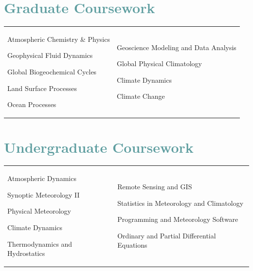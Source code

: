 \documentclass[margin,line,palatino,courier,10pt]{res}
\newenvironment{list1}{
  \begin{list}{\ding{113}}{%
      \setlength{\itemsep}{0in}
      \setlength{\parsep}{0in} \setlength{\parskip}{0in}
      \setlength{\topsep}{0in} \setlength{\partopsep}{0in}
      \setlength{\leftmargin}{0.17in}}}{\end{list}}
\begin{document}
\begin{resume}
\section{\sc \textcolor{CadetBlue}{\large{Graduate Coursework}}}
\vspace{-0.1in}
\begin{tabular}{@{}p{2.2in}p{3in}}
\begin{list1}
\item Atmospheric Chemistry \& Physics 
\item Geophysical Fluid Dynamics
\item Global Biogeochemical Cycles
\item Land Surface Processes
\item Ocean Processes
\end{list1}
&
\begin{list1}
\item Geoscience Modeling and Data Analysis
\item Global Physical Climatology
\item Climate Dynamics
\item Climate Change
\end{list1}
\end{tabular}

\section{\sc \textcolor{CadetBlue}{\large{Undergraduate Coursework}}}
\vspace{-0.1in}
\begin{tabular}{@{}p{2.2in}p{3in}}
\vspace*{0.04in}
\begin{list1}
\item Atmospheric Dynamics
\item Synoptic Meteorology II
\item Physical Meteorology
\item Climate Dynamics
\item Thermodynamics and Hydrostatics 
\end{list1}
&
\begin{list1}
\item Remote Sensing and GIS
\item Statistics in Meteorology and Climatology
\item Programming and Meteorology Software
\item Ordinary and Partial Differential Equations
\end{list1}


\end{tabular}
\end{resume}
\end{document}
